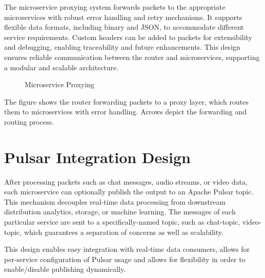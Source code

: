 The microservice proxying system forwards packets to the appropriate microservices with robust error handling and retry mechanisms. It supports flexible data formats, including binary and JSON, to accommodate different service requirements. Custom headers can be added to packets for extensibility and debugging, enabling traceability and future enhancements. This design ensures reliable communication between the router and microservices, supporting a modular and scalable architecture.



\begin{figure}[h]
\centering
{}
\caption{Microservice Proxying}
\label{fig:proxying}
\end{figure}

The figure shows the router forwarding packets to a proxy layer, which routes them to microservices with error handling. Arrows depict the forwarding and routing process.



\section{Pulsar Integration Design}

After processing packets such as chat messages, audio streams, or video data, each microservice can optionally publish the output to an Apache Pulsar topic. This mechanism decouples real-time data processing from downstream distribution analytics, storage, or machine learning. The messages of each particular service are sent to a specifically-named topic, such as chat-topic, video-topic, which guarantees a separation of concerns as well as scalability.

This design enables easy integration with real-time data consumers, allows for per-service configuration of Pulsar usage and allows for flexibility in order to enable/disable publishing dynamically.



